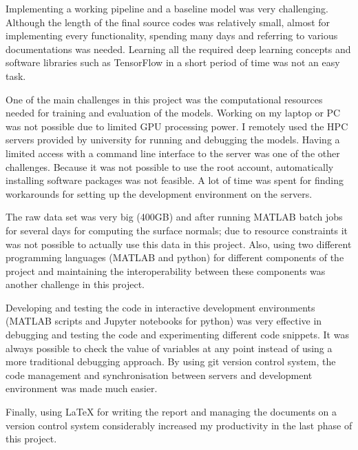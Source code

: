 Implementing a working pipeline and a baseline model was very challenging. Although the length of the final source codes was relatively small, almost for implementing every functionality, spending many days and referring to various documentations was needed. Learning all the required deep learning concepts and software libraries such as TensorFlow in a short period of time was not an easy task. 

One of the main challenges in this project was the computational resources needed for training and evaluation of the models. Working on my laptop or PC was not possible due to limited GPU processing power. I remotely used the HPC servers provided by university for running and debugging the models. Having a limited access with a command line interface to the server was one of the other challenges. Because it was not possible to use the root account, automatically installing software packages was not feasible. A lot of time was spent for finding workarounds for setting up the development environment on the servers. 

The raw data set was very big (400GB) and after running MATLAB batch jobs for several days for computing the surface normals; due to resource constraints it was not possible to actually use this data in this project. Also, using two different programming languages (MATLAB and python) for different components of the project and maintaining the interoperability between these components was another challenge in this project.

Developing and testing the code in interactive development environments (MATLAB scripts and Jupyter notebooks for python) was very effective in debugging and testing the code and experimenting different code snippets. It was always possible to check the value of variables at any point instead of using a more traditional debugging approach. By using git version control system, the code management and synchronisation between servers and development environment was made much easier. 

Finally, using LaTeX for writing the report and managing the documents on a version control system considerably increased my productivity in the last phase of this project.  
